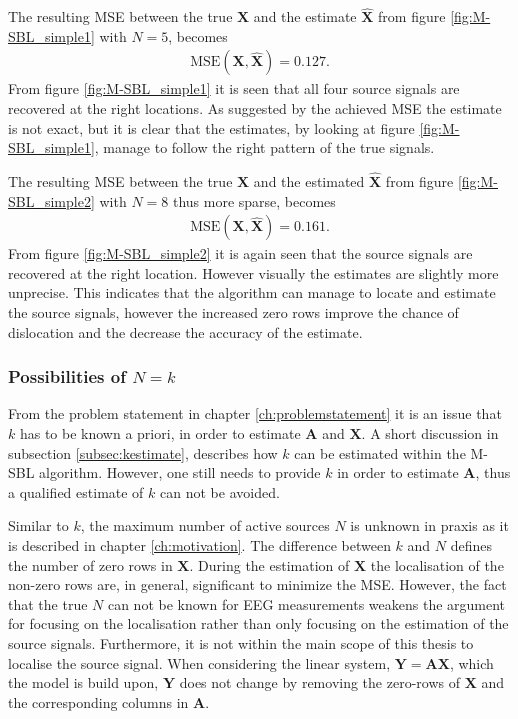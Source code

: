\noindent
The resulting MSE between the true $\mathbf{X}$ and the estimate $\hat{\mathbf{X}}$ from figure \ref{fig:M-SBL_simple1} with $N = 5$, becomes 
\begin{align*}
\text{MSE}(\mathbf{X}, \hat{\mathbf{X}}) = 0.127.
\end{align*}
From figure \ref{fig:M-SBL_simple1} it is seen that all four source signals are recovered at the right locations. 
As suggested by the achieved MSE the estimate is not exact, but it is clear that the estimates, by looking at figure \ref{fig:M-SBL_simple1}, manage to follow the right pattern of the true signals. 

The resulting MSE between the true $\mathbf{X}$ and the estimated $\hat{\mathbf{X}}$ from figure \ref{fig:M-SBL_simple2} with $N = 8$ thus more sparse, becomes 
\begin{align*}
\text{MSE}(\mathbf{X}, \hat{\mathbf{X}}) = 0.161. 
\end{align*}
From figure \ref{fig:M-SBL_simple2} it is again seen that the source signals are recovered at the right location. However visually the estimates are slightly more unprecise. 
This indicates that the algorithm can manage to locate and estimate the source signals, however the increased zero rows improve the chance of dislocation and the decrease the accuracy of the estimate.     

\subsubsection*{Possibilities of $N=k$}
From the problem statement in chapter \ref{ch:problemstatement} it is an issue that $k$ has to be known a priori, in order to estimate $\mathbf{A}$ and $\mathbf{X}$. 
A short discussion in subsection \ref{subsec:kestimate}, describes how $k$ can be estimated within the M-SBL algorithm. 
However, one still needs to provide $k$ in order to estimate $\mathbf{A}$, thus a qualified estimate of $k$ can not be avoided. 

Similar to $k$, the maximum number of active sources $N$ is unknown in praxis as it is described in chapter \ref{ch:motivation}. 
The difference between $k$ and $N$ defines the number of zero rows in $\mathbf{X}$.
During the estimation of $\mathbf{X}$ the localisation of the non-zero rows are, in general, significant to minimize the MSE. 
However, the fact that the true $N$ can not be known for EEG measurements weakens the argument for focusing on the localisation rather than only focusing on the estimation of the source signals. 
Furthermore, it is not within the main scope of this thesis to localise the source signal. 
When considering the linear system, $\mathbf{Y} = \mathbf{AX}$, which the model is build upon, $\mathbf{Y}$ does not change by removing the zero-rows of $\mathbf{X}$ and the corresponding columns in $\mathbf{A}$.

